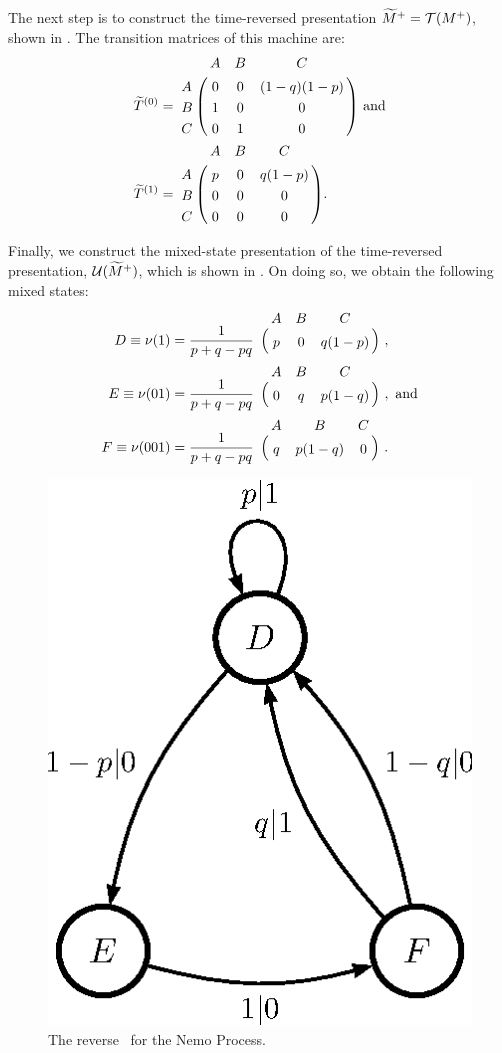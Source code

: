 \documentclass[prl,twocolumn,showpacs,superscriptaddress,preprintnumbers,floatfix]{revtex4}
\theoremstyle{plain}   \newtheorem{Lem}{Lemma}
\theoremstyle{plain} 	\newtheorem{Cor}{Corollary}
\theoremstyle{plain} 	\newtheorem{The}{Theorem}
\theoremstyle{plain} 	\newtheorem{Prop}{Proposition}
\theoremstyle{plain} 	\newtheorem*{Conj}{Conjecture}
\theoremstyle{plain}	\newtheorem*{Rem}{Remark}
\theoremstyle{plain}	\newtheorem*{Def}{Definition}
\theoremstyle{plain}	\newtheorem*{Not}{Notation}
\begin{document}
The next step is to construct the 
time-reversed presentation $\widetilde{M}^+ = \mathcal{T}({M}^{+})$, shown in 
.  The transition matrices of this machine are:
\begin{align*}
\widetilde{T}^{(0)} &=
    \bordermatrix{
    & A & B & C \cr
  A & 0 & 0 & (1-q)(1-p)\cr
  B & 1 & 0 & 0\cr
  C & 0 & 1 & 0\cr
} \textrm{ and} \\
\widetilde{T}^{(1)} &=
    \bordermatrix{
    & A & B & C \cr
  A & p & 0 & q(1-p)\cr
  B & 0 & 0 & 0\cr
  C & 0 & 0 & 0\cr
}.
\end{align*}

Finally, we construct the mixed-state presentation of the time-reversed
presentation, $\mathcal{U}(\widetilde{M}^+)$, which is shown in 
. On doing so, we obtain the following
mixed states:
\begin{align*}
D \equiv \nu(1) &= \frac{1}{p + q - pq} 
\bordermatrix{
 & A & B & C \cr
 & p & 0 & q(1-p)
} ~,\\
E \equiv \nu(01) &= \frac{1}{p + q - pq} 
\bordermatrix{
 & A & B & C \cr
 & 0 & q & p(1-q)
} ~, ~\mathrm{and}\\
F \equiv \nu(001) &= \frac{1}{p + q - pq} 
\bordermatrix{
 & A & B & C \cr
 & q & p(1-q) & 0 
} ~.
\end{align*}

\begin{figure}
\centering
\includegraphics{nemo_reM_gr.eps}
\caption{The reverse \eM\ for the Nemo Process.
  }
\label{fig:ReverseNemo}
\end{figure}
\end{document}
